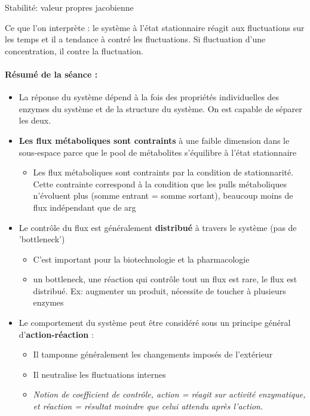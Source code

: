 Stabilité: valeur propres jacobienne

Ce que l'on interprète : le système à l'état stationnaire réagit aux fluctuations sur les temps et il a tendance à contré les fluctuations. Si fluctuation d'une concentration, il contre la fluctuation. 



\paragraph{Résumé de la séance :}
\begin{itemize}
	\item La réponse du système dépend à la fois des propriétés individuelles des enzymes du système et de la structure du système. On est capable de séparer les deux.
	

	\item \textbf{Les flux métaboliques sont contraints} à une faible dimension dans le sous-espace parce que le pool de métabolites  s'équilibre à l'état stationnaire
	\begin{itemize}
		\item Les flux métaboliques sont contraints par la condition de stationnarité. Cette contrainte correspond à la condition que les pulls métaboliques n'évoluent plus (somme entrant = somme sortant), beaucoup moins de flux indépendant que de arg
	\end{itemize}
	
	
	\item Le contrôle du flux est généralement \textbf{distribué} à travers le système (pas de 'bottleneck')
	\begin{itemize}
		\item C'est important pour la biotechnologie et la pharmacologie
		\item un bottleneck, une réaction qui contrôle tout un flux est rare, le flux est distribué.  Ex: augmenter un produit, nécessite de toucher à plusieurs enzymes
	\end{itemize}

	\item Le comportement du système peut être considéré sous un principe général d'\textbf{action-réaction} :
	\begin{itemize}
		\item Il tamponne généralement les changements imposés de l'extérieur
		\item Il neutralise les fluctuations internes
		\item \textit{Notion de coefficient de contrôle, action = réagit sur activité enzymatique, et réaction = résultat moindre que celui attendu après l'action.}
	\end{itemize}
\end{itemize}



